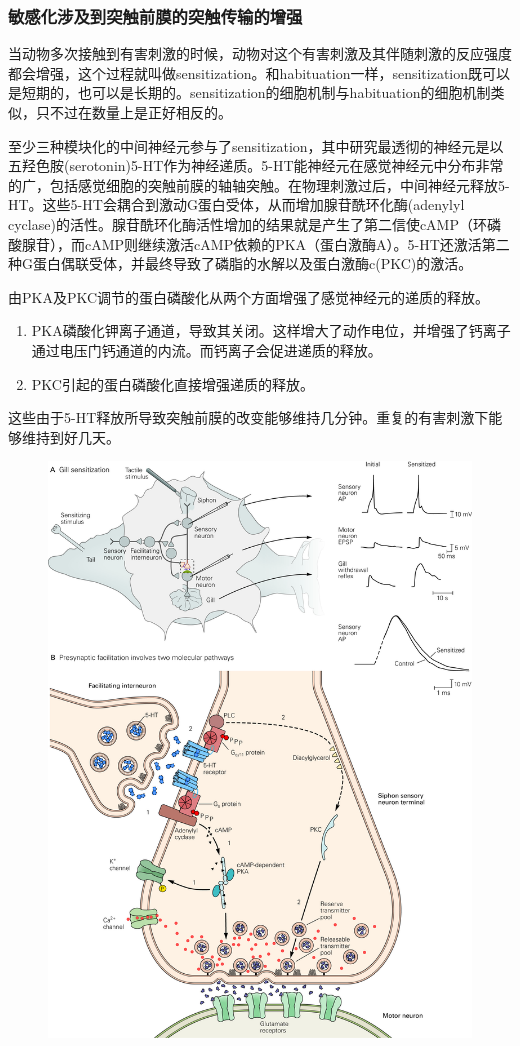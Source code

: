 \documentclass[UTF8,nofonts]{ctexart}
\begin{document}
\subsubsection{敏感化涉及到突触前膜的突触传输的增强}
当动物多次接触到有害刺激的时候，动物对这个有害刺激及其伴随刺激的反应强度都会增强，这个过程就叫做sensitization。和habituation一样，sensitization既可以是短期的，也可以是长期的。sensitization的细胞机制与habituation的细胞机制类似，只不过在数量上是正好相反的。
\par
至少三种模块化的中间神经元参与了sensitization，其中研究最透彻的神经元是以五羟色胺(serotonin)5-HT作为神经递质。5-HT能神经元在感觉神经元中分布非常的广，包括感觉细胞的突触前膜的轴轴突触。在物理刺激过后，中间神经元释放5-HT。这些5-HT会耦合到激动G蛋白受体，从而增加腺苷酰环化酶(adenylyl cyclase)的活性。腺苷酰环化酶活性增加的结果就是产生了第二信使cAMP（环磷酸腺苷），而cAMP则继续激活cAMP依赖的PKA（蛋白激酶A）。5-HT还激活第二种G蛋白偶联受体，并最终导致了磷脂的水解以及蛋白激酶c(PKC)的激活。
\par
由PKA及PKC调节的蛋白磷酸化从两个方面增强了感觉神经元的递质的释放。
\begin{enumerate}
	
	\item  PKA磷酸化钾离子通道，导致其关闭。这样增大了动作电位，并增强了钙离子通过电压门钙通道的内流。而钙离子会促进递质的释放。
	\item PKC引起的蛋白磷酸化直接增强递质的释放。
\end{enumerate}
这些由于5-HT释放所导致突触前膜的改变能够维持几分钟。重复的有害刺激下能够维持到好几天。
\begin{figure}
	\centering
	\includegraphics[scale=0.8]{Pic/6604_PNS5.jpg}
\end{figure}
\end{document}
